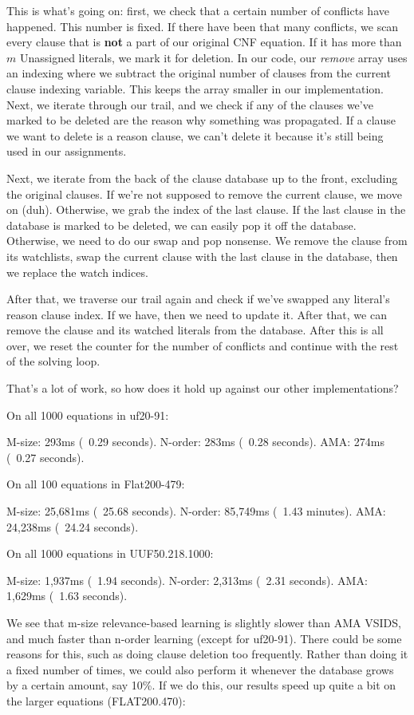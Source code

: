 \documentclass[../main.tex]{subfiles}
\begin{document}
\noindent
This is what's going on: first, we check that a certain number of conflicts have happened. 
This number is fixed. If there have been that many conflicts, we scan every clause that is 
\textbf{not} a part of our original CNF equation. If it has more than $m$ Unassigned literals, 
we mark it for deletion. In our code, our \textit{remove} array uses an indexing where we subtract 
the original number of clauses from the current clause indexing variable. This keeps the array 
smaller in our implementation. Next, we iterate through our trail, and we check if any of the 
clauses we've marked to be deleted are the reason why something was propagated. If a clause we 
want to delete is a reason clause, we can't delete it because it's still being used in our 
assignments. 

Next, we iterate from the back of the clause database up to the front, excluding the 
original clauses. If we're not supposed to remove the current clause, we move on (duh).
Otherwise, we grab the index of the last clause. If the last clause in the database is 
marked to be deleted, we can easily pop it off the database. Otherwise, we need to do 
our swap and pop nonsense. We remove the clause from its watchlists, swap the current 
clause with the last clause in the database, then we replace the watch indices. 

After that, we traverse our trail again and check if we've swapped any literal's 
reason clause index. If we have, then we need to update it. After that, we can 
remove the clause and its watched literals from the database. After this is all over,
we reset the counter for the number of conflicts and continue with the rest of the 
solving loop. 

That's a lot of work, so how does it hold up against our other implementations?
\begin{FVerbatim}
On all 1000 equations in uf20-91:

M-size:    293ms (~0.29 seconds).
N-order:   283ms (~0.28 seconds).
AMA:       274ms (~0.27 seconds).

On all 100 equations in Flat200-479:

M-size:    25,681ms (~25.68 seconds).
N-order:   85,749ms (~1.43 minutes).
AMA:       24,238ms (~24.24 seconds).

On all 1000 equations in UUF50.218.1000:

M-size:    1,937ms (~1.94 seconds).
N-order:   2,313ms (~2.31 seconds).
AMA:       1,629ms (~1.63 seconds).
\end{FVerbatim}
\noindent
We see that m-size relevance-based learning is slightly slower than AMA VSIDS, and much faster 
than n-order learning (except for uf20-91). There could be some reasons for this, such as doing 
clause deletion too frequently. Rather than doing it a fixed number of times, we could also 
perform it whenever the database grows by a certain amount, say 10\%. If we do this, our results 
speed up quite a bit on the larger equations (FLAT200.470):
\end{document}
